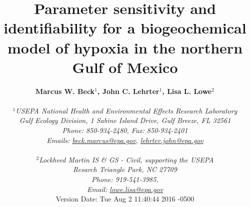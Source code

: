 \documentclass[letterpaper,12pt,oneside]{article}\usepackage[]{graphicx}\usepackage[]{color}
\begin{document}
\raggedbottom
\linenumbers
\raggedright
{}
\setlength{\parindent}{0.5in}
\renewcommand\refname{References \vspace{12pt}}

\begin{singlespace}
\title{{\bf {\Large Parameter sensitivity and identifiability for a biogeochemical model of hypoxia in the northern {G}ulf of {M}exico}}}
\author{
  {\bf {\normalsize Marcus W. Beck$^1$, John C. Lehrter$^1$, Lisa L. Lowe$^2$}}
  \\\\{\textit {\normalsize $^1$USEPA National Health and Environmental Effects Research Laboratory}}
  \\{\textit {\normalsize Gulf Ecology Division, 1 Sabine Island Drive, Gulf Breeze, FL 32561}}
	\\{\textit {\normalsize Phone: 850-934-2480, Fax: 850-934-2401}}
	\\{\textit {\normalsize Emails: \href{mailto:beck.marcus@epa.gov}{beck.marcus@epa.gov}, \href{mailto:lehrter.john@epa.gov}{lehrter.john@epa.gov}}}
	\\\\{\textit {\normalsize $^2$Lockheed Martin IS \& GS - Civil, supporting the USEPA}}
	\\{\textit {\normalsize Resarch Triangle Park, NC 27709}}
	\\{\textit {\normalsize Phone: 919-541-3985,}}
	\\{\textit {\normalsize Email: \href{mailto:lowe.lisa@epa.gov}{lowe.lisa@epa.gov}}}
  \vspace{1in} 
  \\ Version Date:   Tue Aug 2 11:40:44 2016 -0500
	}
\date{}
\maketitle
\end{singlespace}
\clearpage
\end{document}
